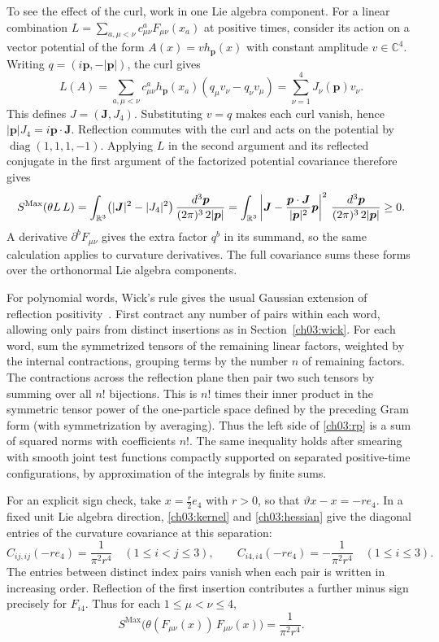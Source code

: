 To see the effect of the curl, work in one Lie algebra component.
For a linear combination $L=\sum_{a,\mu<\nu}c^a_{\mu\nu}F_{\mu\nu}(x_a)$
at positive times, consider its action on a vector potential of the form
$A(x)=v h_{\boldsymbol p}(x)$ with constant amplitude $v\in\mathbb C^4$.
Writing $q=(i\boldsymbol p,-|\boldsymbol p|)$, the curl gives
\[
 L(A)=\sum_{a,\mu<\nu}c^a_{\mu\nu}h_{\boldsymbol p}(x_a)
           (q_\mu v_\nu-q_\nu v_\mu)
     =\sum_{\nu=1}^4 J_\nu(\boldsymbol p)v_\nu .
\]
This defines $J=(\boldsymbol J,J_4)$. Substituting $v=q$ makes each
curl vanish, hence $|\boldsymbol p|J_4=i\boldsymbol p\cdot\boldsymbol J$.
Reflection commutes with the curl and acts on the potential by
$\operatorname{diag}(1,1,1,-1)$. Applying $L$ in the second argument and
its reflected conjugate in the first argument of the factorized potential
covariance therefore gives
\[
 S^{\mathrm{Max}}(\theta L\,L)
 =\int_{\mathbb R^3}\bigl(|\boldsymbol J|^2-|J_4|^2\bigr)
       \,\frac{d^3\boldsymbol p}{(2\pi)^3\,2|\boldsymbol p|}
 =\int_{\mathbb R^3}\left|\boldsymbol J-
       \frac{\boldsymbol p\cdot\boldsymbol J}{|\boldsymbol p|^2}\boldsymbol p\right|^2
       \,\frac{d^3\boldsymbol p}{(2\pi)^3\,2|\boldsymbol p|}\ge0 .
\]
A derivative $\partial^b F_{\mu\nu}$ gives the extra factor $q^b$
in its summand, so the same calculation applies to curvature derivatives.
The full covariance sums these forms over the orthonormal Lie algebra components.

For polynomial words, Wick's rule gives the usual Gaussian extension of
reflection positivity~\cite{OsterwalderSchrader1973,OsterwalderSchrader1975}.
First contract any number of pairs within each word, allowing only pairs
from distinct insertions as in Section~\ref{ch03:wick}. For each word, sum
the symmetrized tensors of the remaining linear factors, weighted by the
internal contractions, grouping terms by the number $n$ of remaining factors.
The contractions across the reflection plane then pair two such tensors
by summing over all $n!$ bijections. This is $n!$ times their inner product
in the symmetric tensor power of the one-particle space defined by the
preceding Gram form (with symmetrization by averaging).
Thus the left side of \eqref{ch03:rp} is a sum of squared norms with
coefficients $n!$. The same inequality holds after smearing with smooth
joint test functions compactly supported on separated positive-time
configurations, by approximation of the integrals by finite sums.

For an explicit sign check, take $x=\tfrac r2 e_4$ with $r>0$, so that
$\vartheta x-x=-r e_4$. In a fixed unit Lie algebra direction,
\eqref{ch03:kernel} and \eqref{ch03:hessian} give the diagonal entries
of the curvature covariance at this separation:
\[
 C_{ij,ij}(-r e_4)=\frac{1}{\pi^2 r^4}\quad(1\le i<j\le3),
 \qquad
 C_{i4,i4}(-r e_4)=-\frac{1}{\pi^2 r^4}\quad(1\le i\le3).
\]
The entries between distinct index pairs vanish when each pair is written
in increasing order. Reflection of the first insertion contributes a further
minus sign precisely for $F_{i4}$. Thus for each $1\le\mu<\nu\le4$,
\[
 S^{\mathrm{Max}}\bigl(\theta(F_{\mu\nu}(x))\,F_{\mu\nu}(x)\bigr)
 =\frac{1}{\pi^2 r^4}.
\]

